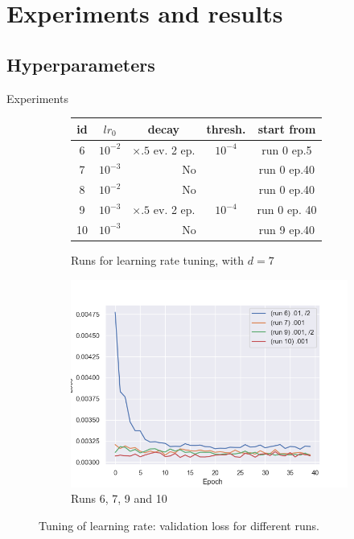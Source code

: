 \documentclass[9pt]{beamer}
\begin{document}
\section{Experiments and results}
\subsection{Hyperparameters}
\begin{frame}{Experiments}


\begin{figure}[!ht]
    \begin{subfigure}{.6\linewidth}
        \footnotesize
        \begin{tabular}{|c|c|c|c|c|}
            \hline
            id & $lr_0$ & decay & thresh. & start from\\
            \hline
            \hline
            6 & $10^{-2}$ & $\times .5$ ev. 2 ep. & $10^{-4}$ & run 0 ep.5 \\
            \hline
            7 & $10^{-3}$ & \multicolumn{2}{|c|}{No} & run 0 ep.40 \\
            \hline
            8 & $10^{-2}$ & \multicolumn{2}{|c|}{No} & run 0 ep.40 \\
            \hline
            9 & $10^{-3}$ & $\times .5$ ev. 2 ep. & $10^{-4}$ & run 0 ep. 40 \\
            \hline
            10 & $10^{-3}$ & \multicolumn{2}{|c|}{No} & run 9 ep.40\\
            \hline
        \end{tabular}
        \caption{\footnotesize Runs for learning rate tuning, with $d=7$}
    \end{subfigure}
    \begin{subfigure}{.39\linewidth}
        \centering
        \includegraphics[width=\linewidth]{pics/hpp-lr-loss-67910.png}
        \caption{\footnotesize Runs 6, 7, 9 and 10}
    \end{subfigure}
    \caption{\footnotesize Tuning of learning rate: validation loss for different runs.}
\end{figure}


\end{frame}
\end{document}
